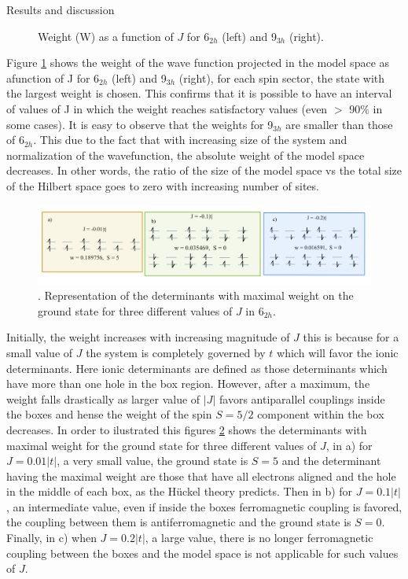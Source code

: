 \documentclass[12pt,twoside]{report}
\begin{document}
\begin{chapter}{Results and discussion}
\begin{figure}[ht]
\begin{minipage}{0.4\textwidth}
		\end{minipage}
		\caption{\label{fig_w69} Weight (W) as a function of $J$ for 6$_{2h}$ (left) and 9$_{3h}$ (right). }
	\end{figure}
	Figure \ref{fig_w69} shows the weight of the wave function projected in the
	model space as afunction of J for 6$_{2h}$ (left) and 9$_{3h}$ (right), for
	each spin sector, the state with the largest weight is chosen. This confirms
	that it is possible to have an interval of values of J in which the weight
	reaches satisfactory values (even $>$ 90$\%$ in some cases). It is easy to
	observe that the weights for 9$_{3h}$ are smaller than those of 6$_{2h}$.
	This due to the fact that with increasing size of the system and
	normalization of the wavefunction, the absolute weight of the model space
	decreases. In other words, the ratio of the size of the model space vs the
	total size of the Hilbert space goes to zero with increasing number of sites.
	
	\begin{figure}[h!]
		\centering
			\includegraphics[scale=0.22]{determinants.jpg}
		\caption{\label{determinants}. Representation of the determinants with maximal weight on the ground state for three different values of $J$ in 6$_{2h}$.}
	\end{figure}
	 
	 Initially, the weight increases with increasing magnitude of $J$ this is
	 because for a small value of $J$ the system is completely governed by $t$
	 which will favor the ionic determinants. Here ionic determinants are
	 defined as those determinants which have more than one hole in the box
	 region. However, after a maximum, the weight falls drastically as larger
	 value of $|J|$ favors antiparallel couplings inside the boxes and hense the
	 weight of the spin $S=5 \slash 2$ component within the box decreases. In
	 order to ilustrated this figures \ref{determinants} shows the determinants
	 with maximal weight for the ground state for three different values of $J$,
	 in a) for $J=0.01|t|$, a very small value, the ground state is $S=5$ and
	 the determinant having the maximal weight are those that have all
	 electrons aligned and the hole in the middle of each box, as the Hückel
	 theory predicts. Then in b) for $J=0.1|t|$, an intermediate value,
	 even if inside the boxes ferromagnetic coupling is favored, the coupling
	 between them is antiferromagnetic and the ground state is $S=0$. Finally,
	 in c) when $J=0.2|t|$, a large value, there is no longer ferromagnetic
	 coupling between the boxes and the model space is not applicable for such values of $J$.
	

\end{chapter}
\end{document}
